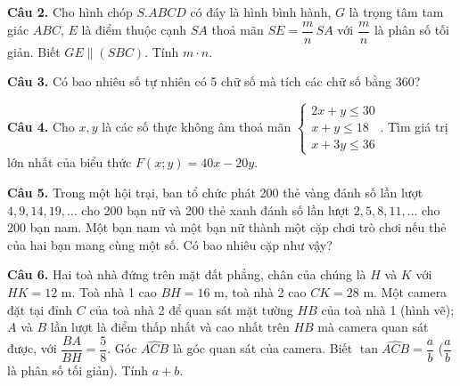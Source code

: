 \documentclass[11pt,a4paper]{article}
\newcommand{\Cau}[1]{\textbf{Câu #1.}}
\begin{document}
\Cau{2} Cho hình chóp $S.ABCD$ có đáy là hình bình hành, $G$ là trọng tâm tam giác $ABC$, $E$ là điểm thuộc cạnh $SA$ thoả mãn $SE=\dfrac mn\,SA$ với $\dfrac mn$ là phân số tối giản. Biết $GE\parallel(SBC)$. Tính $m\cdot n$.

\Cau{3} Có bao nhiêu số tự nhiên có 5 chữ số mà tích các chữ số bằng 360?

\Cau{4} Cho $x,y$ là các số thực không âm thoả mãn $\begin{cases}2x+y\le30\\ x+y\le18\\ x+3y\le36\end{cases}$. Tìm giá trị lớn nhất của biểu thức $F(x;y)=40x-20y$.

\Cau{5} Trong một hội trại, ban tổ chức phát 200 thẻ vàng đánh số lần lượt $4,9,14,19,\dots$ cho 200 bạn nữ và 200 thẻ xanh đánh số lần lượt $2,5,8,11,\dots$ cho 200 bạn nam. Một bạn nam và một bạn nữ thành một cặp chơi trò chơi nếu thẻ của hai bạn mang cùng một số. Có bao nhiêu cặp như vậy?

\noindent\begin{minipage}[t]{0.64\linewidth}
\Cau{6} Hai toà nhà đứng trên mặt đất phẳng, chân của chúng là $H$ và $K$ với $HK=12$ m. Toà nhà 1 cao $BH=16$ m, toà nhà 2 cao $CK=28$ m. Một camera đặt tại đỉnh $C$ của toà nhà 2 để quan sát mặt tường $HB$ của toà nhà 1 (hình vẽ); $A$ và $B$ lần lượt là điểm thấp nhất và cao nhất trên $HB$ mà camera quan sát được, với $\dfrac{BA}{BH}=\dfrac58$. Góc $\widehat{ACB}$ là góc quan sát của camera. Biết $\tan\widehat{ACB}=\dfrac ab$ ($\dfrac ab$ là phân số tối giản). Tính $a+b$.
\end{minipage}\hfill
\begin{minipage}[t]{0.32\linewidth}\vspace{0pt}\centering
{}
\end{minipage}
\end{document}
